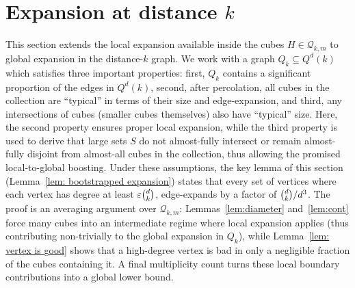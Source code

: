 \documentclass{article}
\theoremstyle{definition}
\newcommand{\cQ}{\mathcal{Q}}
\begin{document}
\section{\texorpdfstring{Expansion at distance $k$}{Expansion at distance k}}\label{sec: long distances}
This section extends the local expansion available inside the cubes $H\in\cQ_{k,m}$ to global expansion in the distance-$k$ graph. 
We work with a graph $Q_k\subseteq Q^d(k)$ %
which satisfies three important properties: 
first, $Q_k$ contains a significant proportion of the edges in $Q^d(k)$, second, after percolation, all cubes in the collection are ``typical'' in terms of their size and edge-expansion, and third, any intersections of cubes (smaller cubes themselves) also have ``typical'' size. 
Here, the second property ensures proper local expansion, while the third property is used to derive that large sets $S$ do not almost-fully intersect or remain almost-fully disjoint from almost-all cubes in the collection, thus allowing the promised local-to-global boosting.
Under these assumptions, the key lemma of this section (Lemma~\ref{lem: bootstrapped expansion}) states that every set of vertices where each vertex has degree at least $\varepsilon \tbinom{d}{k}$, edge-expands by a factor of $\tbinom{d}{k}/d^3$. 
The proof is an averaging argument over $\cQ_{k,m}$: Lemmas~\ref{lem:diameter} and~\ref{lem:cont} force many cubes into an intermediate regime where local expansion applies (thus contributing non-trivially to the global expansion in $Q_k$), while Lemma~\ref{lem: vertex is good} shows that a high-degree vertex is bad in only a negligible fraction of the cubes containing it. A final multiplicity count turns these local boundary contributions into a global lower bound.
\end{document}
